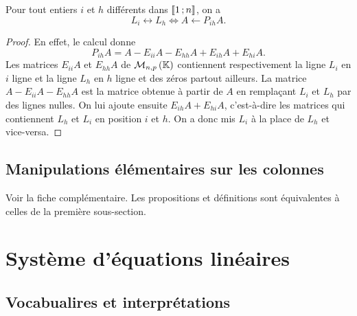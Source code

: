%
\begin{prop}
  Pour tout entiers \(i\) et \(h\) différents dans \(\mathopen{\llbracket}1\mathclose{}\mathpunct{};n\mathclose{\rrbracket}\), on a
  \begin{equation}
    L_i \leftrightarrow L_h \iff A \leftarrow P_{ih}A.
  \end{equation}
\end{prop}
\begin{proof}
  En effet, le calcul donne
  \begin{equation}
    P_{ih}A = A - E_{ii}A-E_{hh}A+E_{ih}A+E_{hi}A.
  \end{equation}
  Les matrices \(E_{ii}A\) et \(E_{hh}A\) de \(\mathcal{M}_{n,p}\left(\mathbb{K}\right)\) contiennent respectivement la ligne \(L_i\) en \(i\)\ieme{} ligne et la ligne \(L_h\) en \(h\)\ieme{} ligne et des zéros partout ailleurs. La matrice \(A - E_{ii}A-E_{hh}A\) est la matrice obtenue à partir de \(A\) en remplaçant \(L_i\) et \(L_h\) par des lignes nulles. On lui ajoute ensuite \(E_{ih}A+E_{hi}A\), c'est-à-dire les matrices qui contiennent \(L_h\) et \(L_i\) en position \(i\) et \(h\). On  a donc mis \(L_i\) à la place de \(L_h\) et vice-versa.
\end{proof}
%
\subsection{Manipulations élémentaires sur les colonnes}
Voir la fiche complémentaire. Les propositions et définitions sont équivalentes à celles de la première sous-section.
%
\section{Système d'équations linéaires}
\subsection{Vocabualires et interprétations}
